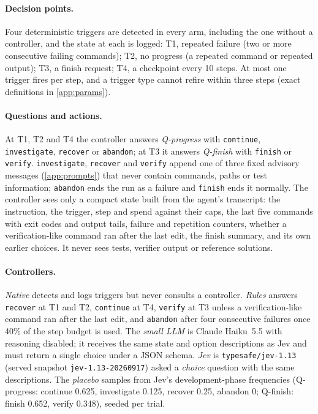 \documentclass[10pt]{article}
\begin{document}
\paragraph{Decision points.}
Four deterministic triggers are detected in every arm, including the one without a controller, and the state at each is logged:
T1, repeated failure (two or more consecutive failing commands);
T2, no progress (a repeated command or repeated output);
T3, a finish request;
T4, a checkpoint every 10 steps.
At most one trigger fires per step, and a trigger type cannot refire within three steps (exact definitions in \cref{app:params}).

\paragraph{Questions and actions.}
At T1, T2 and T4 the controller answers \emph{Q-progress} with \texttt{continue}, \texttt{investigate}, \texttt{recover} or \texttt{abandon}; at T3 it answers \emph{Q-finish} with \texttt{finish} or \texttt{verify}.
\texttt{investigate}, \texttt{recover} and \texttt{verify} append one of three fixed advisory messages (\cref{app:prompts}) that never contain commands, paths or test information; \texttt{abandon} ends the run as a failure and \texttt{finish} ends it normally.
The controller sees only a compact state built from the agent's transcript: the instruction, the trigger, step and spend against their caps, the last five commands with exit codes and output tails, failure and repetition counters, whether a verification-like command ran after the last edit, the finish summary, and its own earlier choices.
It never sees tests, verifier output or reference solutions.

\paragraph{Controllers.}
\emph{Native} detects and logs triggers but never consults a controller.
\emph{Rules} answers \texttt{recover} at T1 and T2, \texttt{continue} at T4, \texttt{verify} at T3 unless a verification-like command ran after the last edit, and \texttt{abandon} after four consecutive failures once 40\% of the step budget is used.
The \emph{small LLM} is Claude Haiku~5.5 with reasoning disabled; it receives the same state and option descriptions as Jev and must return a single choice under a JSON schema.
\emph{Jev} is \texttt{typesafe/jev-1.13} (served snapshot \texttt{jev-1.13-20260917}) asked a \emph{choice} question with the same descriptions.
The \emph{placebo} samples from Jev's development-phase frequencies (Q-progress: continue 0.625, investigate 0.125, recover 0.25, abandon 0; Q-finish: finish 0.652, verify 0.348), seeded per trial.
\end{document}
